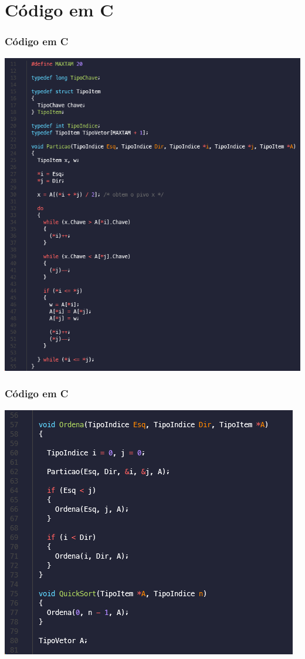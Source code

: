 \documentclass[
	11pt, %
]{beamer}
\begin{document}
\section{Código em C}
\begin{frame}
	\frametitle{Código em C}
	\includegraphics[width=0.7\linewidth]{quick_sort_in_c_particao}
\end{frame}
\begin{frame}
	\frametitle{Código em C}
	\includegraphics[width=0.7\linewidth]{quick_sort_in_c_ordena}
\end{frame}
\end{document}
